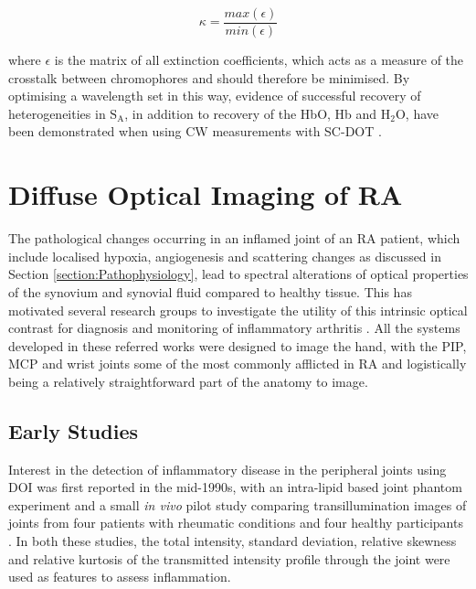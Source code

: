 \documentclass[twoside]{bhamthesis}
\theoremstyle{definition}
\begin{document}
\begin{equation}
\kappa = \frac{max\left( \textbf{$\epsilon$} \right)} {min\left( \textbf{$\epsilon$} \right)}
  \label{eqn:Lambert-Bouger}
\end{equation}

where $\textbf{$\epsilon$}$ is the matrix of all extinction coefficients, which acts as a measure of the crosstalk between chromophores and should therefore be minimised. By optimising a wavelength set in this way, evidence of successful recovery of heterogeneities in $\mathrm{S_A}$, in addition to recovery of the HbO, Hb and $\mathrm{H_2O}$, have been demonstrated when using CW measurements with SC-DOT  \cite{corlu2005diffuse,eames2008wavelength}. 

\section{Diffuse Optical Imaging of RA}


\label{section:Optical_Imaging_of_Arthritis}

The pathological changes occurring in an inflamed joint of an RA patient, which include localised hypoxia, angiogenesis and scattering changes as discussed in Section 
\ref{section:Pathophysiology}, lead to spectral alterations of optical properties of the synovium and synovial fluid compared to healthy tissue. This has motivated several research groups to investigate the utility of this intrinsic optical contrast for diagnosis and monitoring of inflammatory arthritis \cite{hielscher2004sagittal,beuthan2007ra,minet2007analysis,meier2012potential}.  
All the systems developed in these referred works were designed to image the hand, with the PIP, MCP and wrist joints some of the most commonly afflicted in RA \cite{harris2005clinical} and logistically being a relatively straightforward part of the anatomy to image.

\subsection{Early Studies}

Interest in the detection of inflammatory disease in the peripheral joints using DOI was first reported in the mid-1990s, with an intra-lipid based joint phantom experiment \cite{prapavat1995evaluation} and a small \textit{in vivo} pilot study comparing transillumination images of joints from four patients with rheumatic conditions and four healthy participants \cite{prapavat1995vivo}. In both these studies, the total intensity, standard deviation, relative skewness and relative kurtosis of the transmitted intensity profile through the joint were used as features to assess inflammation. 
\end{document}
